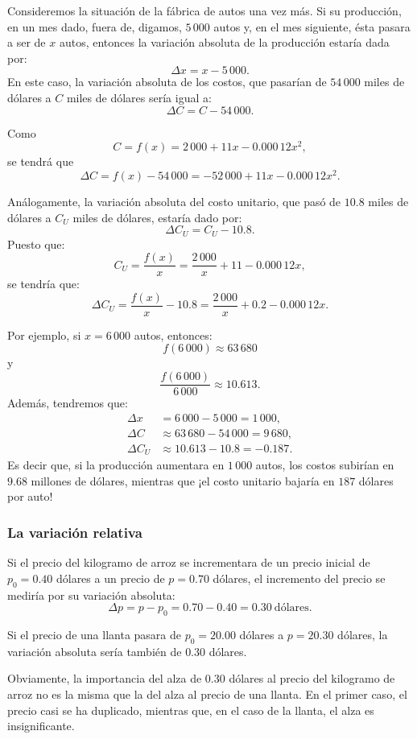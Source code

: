 \begin{exemplo}[]{}
Consideremos la situación de la fábrica de autos una vez más. Si su producción, en un mes dado,
fuera de, digamos, $5\,000$ autos y, en el mes siguiente, ésta pasara a ser de $x$ autos, entonces
la variación absoluta de la producción estaría dada por:
\[
\Delta x=x-5\,000.
\]
En este caso, la variación absoluta de los costos, que pasarían de $54\,000$ miles de dólares a $C$
miles de dólares sería igual a:
\[
\Delta C=C-54\,000.
\]

Como
\[
C = f(x)= 2\,000+11x-0.000\,12x^2,
\]
se tendrá que
\[
\Delta C=f(x)-54\,000 =-52\,000 + 11x - 0.000\,12x^2.
\]

Análogamente, la variación absoluta del costo unitario, que pasó de $10.8$ miles de dólares a $C_U$
miles de dólares, estaría dado por:
\[
\Delta C_U=C_U-10.8.
\]
Puesto que:
\[
C_U = \frac{f(x)}{x}= \frac{2\,000}{x}+11-0.000\,12x,
\]
se tendría que:
\[
\Delta C_U = \frac{f(x)}{x}-10.8= \frac{2\,000}{x}+0.2 -0.000\,12x.
\]

Por ejemplo, si $x=6\,000$ autos, entonces:
\[
f(6\,000) \approx 63\,680
\]
y
\[
\frac{f(6\,000)}{6\,000}\approx 10.613.
\]
Además, tendremos que:
\begin{align*}
\Delta x & = 6\,000-5\,000=1\,000,\\
\Delta C & \approx 63\,680-54\,000= 9\,680, \\
\Delta C_U & \approx 10.613-10.8 = -0.187.
\end{align*}
Es decir que, si la producción aumentara en $1\,000$ autos, los costos subirían en $9.68$ millones
de dólares, mientras que ¡el costo unitario bajaría en $187$ dólares por auto!
\end{exemplo}

\subsubsection{La variación relativa}
Si el precio del kilogramo de arroz se incrementara de un precio inicial de $p_{0} = 0.40$ dólares
a un precio de $p = 0.70$ dólares, el incremento del precio se mediría por su variación absoluta:
\[
\Delta p = p - p_{0} = 0.70 - 0.40 = 0.30\ \text{dólares}.
\]

Si el precio de una llanta pasara de $p_{0} = 20.00$ dólares a $p = 20.30$ dólares, la variación
absoluta sería también de $0.30$ dólares.

Obviamente, la importancia del alza de $0.30$ dólares al precio del kilogramo de arroz no es la
misma que la del alza al precio de una llanta. En el primer caso, el precio casi se ha duplicado,
mientras que, en el caso de la llanta, el alza es insignificante.

